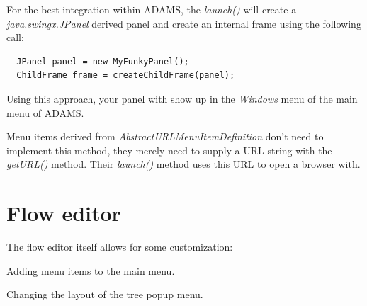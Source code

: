 For the best integration within ADAMS, the \textit{launch()} will create a
\textit{java.swingx.JPanel} derived panel and create an internal frame using the
following call:
\begin{verbatim}
  JPanel panel = new MyFunkyPanel();
  ChildFrame frame = createChildFrame(panel);
\end{verbatim}
Using this approach, your panel with show up in the \textit{Windows} menu of the
main menu of ADAMS.

Menu items derived from \textit{AbstractURLMenuItemDefinition} don't need to
implement this method, they merely need to supply a URL string with the
\textit{getURL()} method. Their \textit{launch()} method uses this URL to open a
browser with.

\section{Flow editor}
The flow editor itself allows for some customization:
\begin{tight_itemize}
  \item Adding menu items to the main menu.
  \item Changing the layout of the tree popup menu.
\end{tight_itemize}

